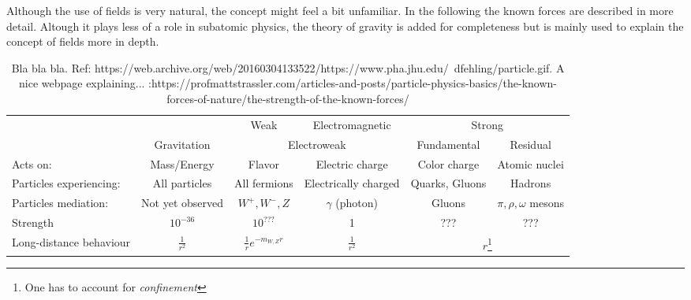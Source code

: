 Although the use of fields is very natural, the concept might feel a bit unfamiliar. In the following the known forces are described in more detail. Altough it plays less of a role in subatomic physics, the theory of gravity is added for completeness but is mainly used to explain the concept of fields more in depth.

\begin{table}[]
\label{tab:forces}
\begin{scriptsize}
\begin{tabular}{|l|c|c|c|c|c|}
\hline
\rowcolor{grey}
       &       & Weak                       & Electromagnetic      & \multicolumn{2}{|c|}{Strong}                            \\ \cline{3-6}
\rowcolor{grey}
\multirow{-2}{*}{\textbf{Interaction}}      & \multirow{-2}{*}{Gravitation} & \multicolumn{2}{|c|}{Electroweak}                                     & Fundamental    & Residual                   \\ \hline \hline
\cellcolor{grey} Acts on:                & Mass/Energy      & Flavor                     & Electric charge      & Color charge   & Atomic nuclei              \\ \hline
\cellcolor{grey}Particles experiencing: & All particles    & All fermions               & Electrically charged & Quarks, Gluons & Hadrons                    \\ \hline
\cellcolor{grey}Particles mediation:    & Not yet observed & $W^+,W^-, Z$               & $\gamma$ (photon)    & Gluons         & $\pi, \rho, \omega$ mesons \\ \hline
\cellcolor{grey}Strength                & $10^{-36}$       & $10^{???}$                 & 1                    & ???            & ???                        \\ \hline
\cellcolor{grey}Long-distance behaviour & $\frac{1}{r^2}$  & $\frac{1}{r}e^{-m_{W,Z}r}$ & $\frac{1}{r^2}$      & \multicolumn{2}{|c|}{$r$\footnote{One has to account for \textit{confinement}}}      \\ \hline
\end{tabular}
\end{scriptsize}
\caption{Bla bla bla. Ref: https://web.archive.org/web/20160304133522/https://www.pha.jhu.edu/~dfehling/particle.gif. A nice webpage explaining... :https://profmattstrassler.com/articles-and-posts/particle-physics-basics/the-known-forces-of-nature/the-strength-of-the-known-forces/
}
\end{table}


